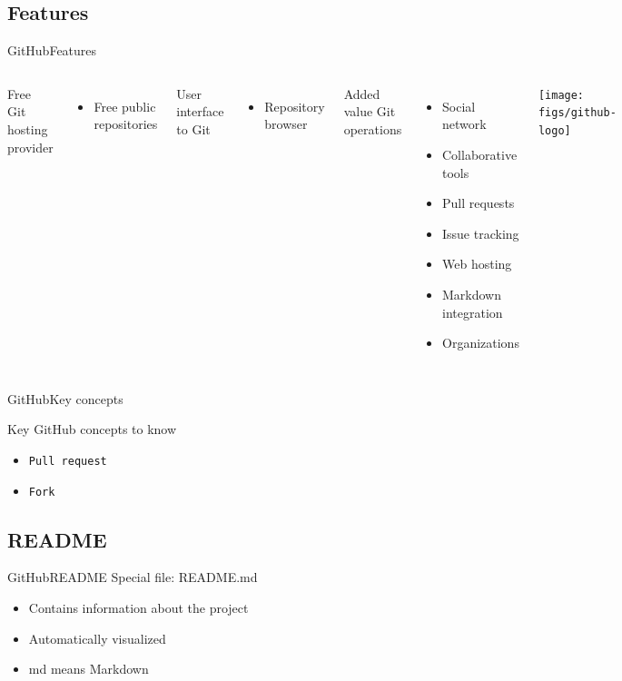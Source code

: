 \documentclass[10pt,compress]{beamer} %
\begin{document}
\subsection{Features}
\begin{frame}{GitHub}{Features}
	\begin{columns}
		Free Git hosting provider
		\begin{itemize}
			\item Free public repositories
		\end{itemize}
		User interface to Git
		\begin{itemize}
			\item Repository browser
		\end{itemize}
		Added value Git operations
		\begin{itemize}
			\item Social network
			\item Collaborative tools
			\item Pull requests	
			\item Issue tracking
			\item Web hosting
			\item Markdown integration
			\item Organizations
		\end{itemize}
	\begin{center}
 		\texttt{[image: figs/github-logo]}
	\end{center}
	\end{columns}
\end{frame}

\begin{frame}{GitHub}{Key concepts}
	\begin{block}{Key GitHub concepts to know}
	\begin{itemize}
	\item \texttt{Pull request}
	\item \texttt{Fork}
	\end{itemize}
	\end{block}
\end{frame}

\subsection{README}
\begin{frame}{GitHub}{README}
	Special file: README.md
	\begin{itemize}
		\item Contains information about the project
		\item Automatically visualized
		\item md means Markdown
	\end{itemize}
\end{frame}
\end{document}
